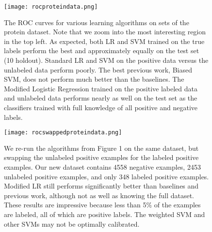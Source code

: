 \documentclass{article}
\begin{document}
\label{ROC for Protein Dataset}
\begin{figure}[ht!]
\centering
\texttt{[image: rocproteindata.png]}
\caption{The ROC curves for various learning algorithms on sets of the protein dataset.  Note that we zoom into the most interesting region in the top left.  As expected, both LR and SVM trained on the true labels perform the best and approximately equally on the test set (10 holdout). Standard LR and SVM on the positive data versus the unlabeled data perform poorly.  The best previous work, Biased SVM, does not perform much better than the baselines.  The Modified Logistic Regression trained on the positive labeled data and unlabeled data performs nearly as well on the test set as the classifiers trained with full knowledge of all positive and negative labels.}
\end{figure}

\label{ROC for Swapped Protein Dataset}
\begin{figure}[ht!]
\vskip 0.2in
\begin{center}
\centerline{\texttt{[image: rocswappedproteindata.png]}}
\caption{We re-run the algorithms from Figure 1 on the same dataset, but swapping the unlabeled positive examples for the labeled positive examples. Our new dataset contains 4558 negative examples, 2453 unlabeled positive examples, and only 348 labeled positive examples.  Modified LR still performs significantly better than baselines and previous work, although not as well as knowing the full dataset.  These results are impressive because less than 5\% of the examples are labeled, all of which are positive labels. The weighted SVM and other SVMs may not be optimally calibrated.}
\label{icml-historical}
\end{center}
\vskip -0.2in
\end{figure} 



\end{document}
